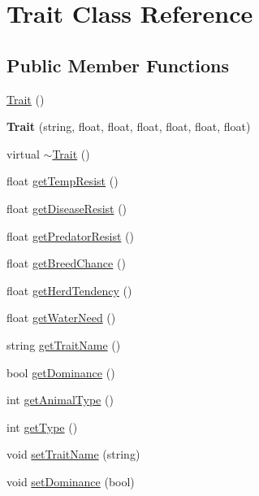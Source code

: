 \hypertarget{class_trait}{}\section{Trait Class Reference}
\label{class_trait}
\subsection*{Public Member Functions}
\begin{DoxyCompactItemize}
\item 
\hyperlink{class_trait_aae36b201023c346213c0e5bcc1c7922f}{Trait} ()
\item 
\mbox{\label{class_trait_a58e7f2810d1eeae90a86ef44c8226642}} 
{\bfseries Trait} (string, float, float, float, float, float, float)
\item 
virtual \hyperlink{class_trait_a28ec215ff3fac94d1657088fee6007a4}{$\sim$\+Trait} ()
\item 
float \hyperlink{class_trait_a7bd7db0c5b950d44aff9ca4943eef187}{get\+Temp\+Resist} ()
\item 
float \hyperlink{class_trait_a4d065437505563d16c1f5cae912d8383}{get\+Disease\+Resist} ()
\item 
float \hyperlink{class_trait_a4275bb208c1fdcb232251d7014b7a9dc}{get\+Predator\+Resist} ()
\item 
float \hyperlink{class_trait_a28ded6c3488a3e8704173bf039bfa936}{get\+Breed\+Chance} ()
\item 
float \hyperlink{class_trait_abc05dc8d331b54d5d9d080a2507efa39}{get\+Herd\+Tendency} ()
\item 
float \hyperlink{class_trait_a169f7d0c6ccb29e5d385c33cc8a87e52}{get\+Water\+Need} ()
\item 
string \hyperlink{class_trait_a4e4fa9d379a0e7f36f1d1577ebd487a0}{get\+Trait\+Name} ()
\item 
bool \hyperlink{class_trait_af5cd74fadebbb43800c2ae93a5007de1}{get\+Dominance} ()
\item 
int \hyperlink{class_trait_ac1bcf9cebceb67efe5c60cf04f85a383}{get\+Animal\+Type} ()
\item 
int \hyperlink{class_trait_a285974c25162993ff108a762b1e5472c}{get\+Type} ()
\item 
void \hyperlink{class_trait_ac0a31db1a9d59ffbbdcb55d58aefbaea}{set\+Trait\+Name} (string)
\item 
void \hyperlink{class_trait_aa8b92de8273b52045e4a545e2bbd4075}{set\+Dominance} (bool)

\end{DoxyCompactItemize}
